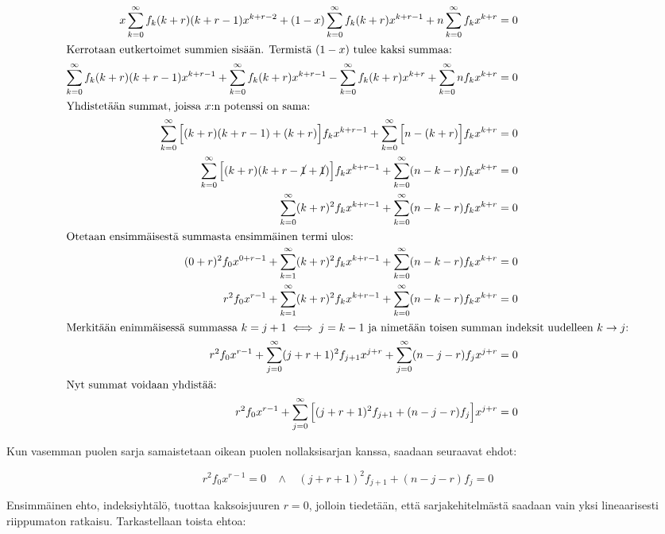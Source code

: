 \documentclass[../johdoksia.tex]{subfiles}
\begin{document}
	\begin{align*}
		x\sum_{k = 0}^{\infty}f_k(k + r)(k + r - 1)x^{k + r - 2} + (1 - x)\sum_{k = 0}^{\infty}f_k(k + r)x^{k + r - 1} + n\sum_{k = 0}^{\infty}f_kx^{k + r} &= 0 \\
		\intertext{Kerrotaan eutkertoimet summien sisään. Termistä $(1 - x)$ tulee kaksi summaa:}
		\sum_{k = 0}^{\infty}f_k(k + r)(k + r - 1)x^{k + r - 1} + \sum_{k = 0}^{\infty}f_k(k + r)x^{k + r - 1} - \sum_{k = 0}^{\infty}f_k(k + r)x^{k + r} + \sum_{k = 0}^{\infty}nf_kx^{k + r} &= 0 \\
		\intertext{Yhdistetään summat, joissa $x$:n potenssi on sama:}
		\sum_{k = 0}^{\infty}\Big[(k + r)(k + r - 1) + (k + r)\Big]f_kx^{k + r - 1} + \sum_{k = 0}^{\infty}\Big[n - (k + r)\Big]f_kx^{k + r} &= 0 \\
		\sum_{k = 0}^{\infty}\Big[(k + r)(k + r - \cancel{1} + \cancel{1})\Big]f_kx^{k + r - 1} + \sum_{k = 0}^{\infty}(n - k - r)f_kx^{k + r} &= 0 \\
		\sum_{k = 0}^{\infty}(k + r)^2f_kx^{k + r - 1} + \sum_{k = 0}^{\infty}(n - k - r)f_kx^{k + r} &= 0 \\
		\intertext{Otetaan ensimmäisestä summasta ensimmäinen termi ulos:}
		(0 + r)^2f_0x^{0 + r - 1} + \sum_{k = 1}^{\infty}(k + r)^2f_kx^{k + r - 1} + \sum_{k = 0}^{\infty}(n - k - r)f_kx^{k + r} &= 0 \\
		r^2f_0x^{r - 1} + \sum_{k = 1}^{\infty}(k + r)^2f_kx^{k + r - 1} + \sum_{k = 0}^{\infty}(n - k - r)f_kx^{k + r} &= 0 \\
		\intertext{Merkitään enimmäisessä summassa $k = j + 1 \iff j = k - 1$ ja nimetään toisen summan indeksit uudelleen $k\to j$:}
		r^2f_0x^{r - 1} + \sum_{j = 0}^{\infty}(j + r + 1)^2f_{j + 1}x^{j + r} + \sum_{j = 0}^{\infty}(n - j - r)f_jx^{j + r} &= 0 \\
		\intertext{Nyt summat voidaan yhdistää:}
		r^2f_0x^{r - 1} + \sum_{j = 0}^{\infty}\Big[(j + r + 1)^2f_{j + 1} + (n - j - r)f_j\Big]x^{j + r} &= 0
	\end{align*}

	\noindent Kun vasemman puolen sarja samaistetaan oikean puolen nollaksisarjan kanssa, saadaan seuraavat ehdot:
	
	\begin{equation*}
		r^2f_0x^{r - 1} = 0 \ \ \ \ \land \ \ \ \ (j + r + 1)^2f_{j + 1} + (n - j - r)f_j = 0
	\end{equation*}

	Ensimmäinen ehto, indeksiyhtälö, tuottaa kaksoisjuuren $r = 0$, jolloin tiedetään, että sarjakehitelmästä saadaan vain yksi lineaarisesti riippumaton ratkaisu. Tarkastellaan toista ehtoa:
	
\end{document}
